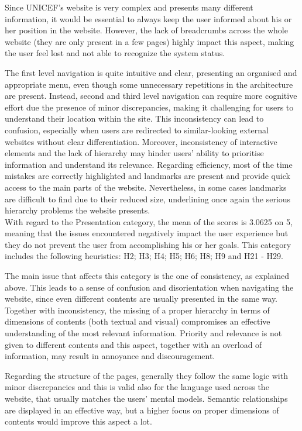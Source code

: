 Since UNICEF’s website is very complex and presents many different information, it would be essential to always keep the user informed about his or her position in the website. However, the lack of breadcrumbs across the whole website (they are only present in a few pages) highly impact this aspect, making the user feel lost and not able to recognize the system status.

The first level navigation is quite intuitive and clear, presenting an organised and appropriate menu, even though some unnecessary repetitions in the architecture are present. Instead, second and third level navigation can require more cognitive effort due the presence of minor discrepancies, making it challenging for users to understand their location within the site. This inconsistency can lead to confusion, especially when users are redirected to similar-looking external websites without clear differentiation. Moreover, inconsistency of interactive elements and the lack of hierarchy may hinder users' ability to prioritise information and understand its relevance.
Regarding efficiency, most of the time mistakes are correctly highlighted and landmarks are present and provide quick access to the main parts of the website. Nevertheless, in some cases landmarks are difficult to find due to their reduced size, underlining once again the serious hierarchy problems the website presents.\\

With regard to the Presentation category, the mean of the scores is 3.0625 on 5, meaning that the issues encountered negatively impact the user experience but they do not prevent the user from accomplishing his or her goals. This category includes the following heuristics: H2; H3; H4; H5; H6; H8; H9 and H21 - H29.

The main issue that affects this category is the one of consistency, as explained above. This leads to a sense of confusion and disorientation when navigating the website, since even different contents are usually presented in the same way. Together with inconsistency, the missing of a proper hierarchy in terms of dimensions of contents (both textual and visual) compromises an effective understanding of the most relevant information. Priority and relevance is not given to different contents and this aspect, together with an overload of information, may result in annoyance and discouragement.

Regarding the structure of the pages, generally they follow the same logic with minor discrepancies and this is valid also for the language used across the website, that usually matches the users’ mental models. Semantic relationships are displayed in an effective way, but a higher focus on proper dimensions of contents would improve this aspect a lot.\\

